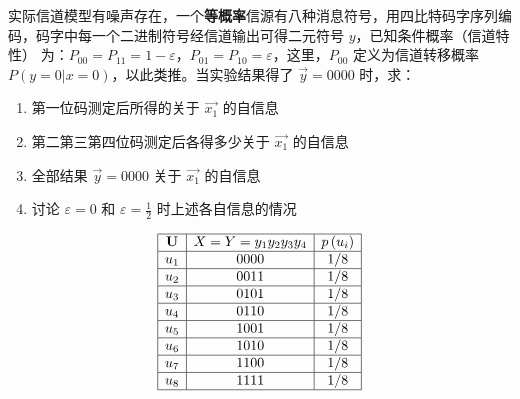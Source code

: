 \begin{remark}
    实际信道模型有噪声存在，一个\textbf{等概率}信源有八种消息符号，用四比特码字序列编码，码字中每一个二进制符号经信道输出可得二元符号 $y$，已知条件概率（信道特性） 为：$P_{00} = P_{11} = 1 - \varepsilon$，$P_{01} = P_{10} = \varepsilon$，这里，$P_{00}$ 定义为信道转移概率$P(y = 0 | x = 0)$，以此类推。当实验结果得了 $\vec{y} = 0000$ 时，求：

    \begin{minipage}{0.5\linewidth}
        \begin{enumerate}
            \item 第一位码测定后所得的关于 $\vec{x_1}$ 的自信息
            \item 第二第三第四位码测定后各得多少关于 $\vec{x_1}$ 的自信息
            \item 全部结果 $\vec{y} = 0000$ 关于 $\vec{x_1}$ 的自信息
            \item 讨论 $\varepsilon = 0$ 和 $\varepsilon = \frac{1}{2}$ 时上述各自信息的情况
        \end{enumerate}
    \end{minipage}
    \hfill
    \begin{minipage}{0.35\linewidth}
        \[\begin{array}{|c|c|c|}
            \hline \mathbf{U} & X=Y=y_{1} y_{2} y_{3} y_{4} & p\left(u_{i}\right) \\
            \hline u_{1} & 0000 & 1/8 \\
            \hline u_{2} & 0011 & 1/8 \\
            \hline u_{3} & 0101 & 1/8 \\
            \hline u_{4} & 0110 & 1/8 \\
            \hline u_{5} & 1001 & 1/8 \\
            \hline u_{6} & 1010 & 1/8 \\
            \hline u_{7} & 1100 & 1/8 \\
            \hline u_{8} & 1111 & 1/8 \\
            \hline
        \end{array}\]
    \end{minipage}
    

\end{remark}
